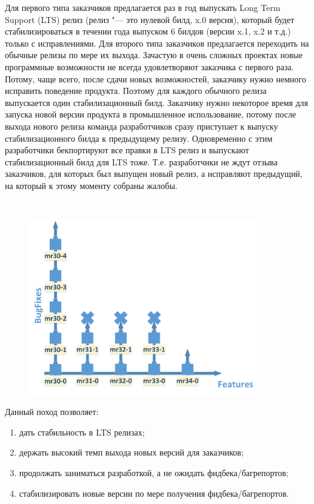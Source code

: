 \documentclass[10pt, a5paper]{article}
\begin{document}
Для первого типа заказчиков предлагается раз в год выпускать Long Term Support (LTS) релиз (релиз "--- это нулевой билд, x.0 версия), который будет стабилизироваться в течении года выпуском 6 билдов (версии x.1, x.2 и т.д.) только с исправлениями.
Для второго типа заказчиков предлагается переходить на обычные релизы по мере их выхода. Зачастую в очень сложных проектах новые программные возможности не всегда удовлетворяют заказчика с первого раза. Потому, чаще всего, после сдачи новых возможностей, заказчику нужно немного исправить поведение продукта. Поэтому для каждого обычного релиза выпускается один стабилизационный билд.
Заказчику нужно некоторое время для запуска новой версии продукта в промышленное использование, потому после выхода нового релиза команда разработчиков сразу приступает к выпуску стабилизационного билда к предыдущему релизу. Одновременно с этим разработчики бекпортируют все правки в LTS релиз и выпускают стабилизационный билд для LTS тоже. Т.е. разработчики не ждут отзыва заказчиков, для которых был выпущен новый релиз, а исправляют предыдущий, на который к этому моменту собраны жалобы.

~

\begin{figure}
  \centering
  \includegraphics[width=10cm]{05_releases_graph_report.png}
\end{figure}

Данный поход позволяет:

\begin{enumerate}
  \item дать стабильность в LTS релизах;
  \item держать высокий темп выхода новых версий для заказчиков;
  \item продолжать заниматься разработкой, а не ожидать фидбека/багрепортов;
  \item стабилизировать новые версии по мере получения фидбека/багрепортов.
\end{enumerate}
\end{document}
